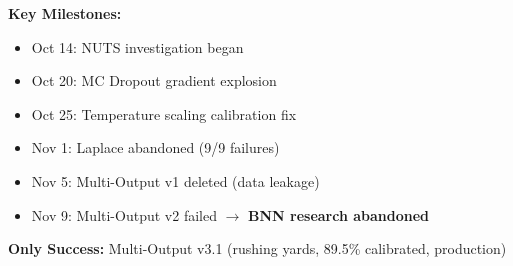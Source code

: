 \begin{table}[htbp]
\footnotesize
\textbf{Key Milestones:}
\begin{itemize}[nosep,leftmargin=*]
    \item Oct 14: NUTS investigation began
    \item Oct 20: MC Dropout gradient explosion
    \item Oct 25: Temperature scaling calibration fix
    \item Nov 1: Laplace abandoned (9/9 failures)
    \item Nov 5: Multi-Output v1 deleted (data leakage)
    \item Nov 9: Multi-Output v2 failed $\rightarrow$ \textbf{BNN research abandoned}
\end{itemize}

\vspace{0.5em}
\textbf{Only Success:} Multi-Output v3.1 (rushing yards, 89.5\% calibrated, production)
\end{table}
